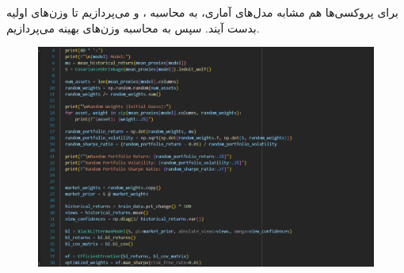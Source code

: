 \documentclass[12pt]{article}
\begin{document}
\subsubsection{}
برای پروکسی‌ها هم مشابه مدل‌های آماری، به محاسبه ،  و  می‌پردازیم تا وزن‌های اولیه بدست آیند. سپس به محاسبه وزن‌های بهینه می‌پردازیم.
\begin{figure}[H]
	\centering
	\includegraphics[width=0.9\linewidth]{pic_23}
\end{figure}
\begin{figure}[H]
	\centering
	\quad \quad
\end{figure}
\end{document}
